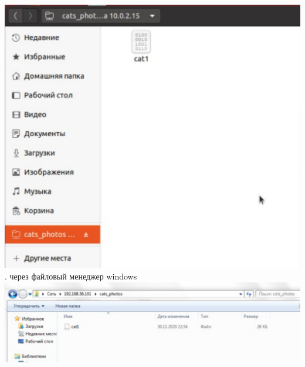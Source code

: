 \documentclass[12pt,a4paper]{scrartcl}
\begin{document}
\includegraphics[scale=10, width=15cm]{f8} \\[5pt]
. через файловый менеджер windows \\[5pt]
\includegraphics[scale=10, width=15cm]{f9}
\end{document}
